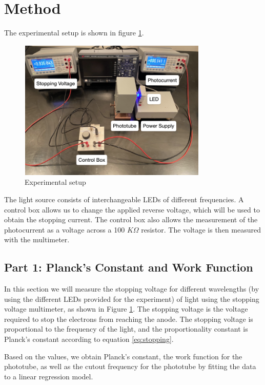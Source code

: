 \section{Method}

The experimental setup is shown in figure \ref{fig:setup}.

\begin{figure}[H]
    \centering
    \includegraphics[width=0.8\textwidth]{method/setup.png}
    \caption{Experimental setup}
    \label{fig:setup}
\end{figure}

The light source consists of interchangeable LEDs of different frequencies. A control box allows us to change the applied reverse voltage, which will be used to obtain the stopping current.
The control box also allows the measurement of the photocurrent as a voltage across a 100 $K\Omega$ resistor. The voltage is then measured with the multimeter.

\subsection{Part 1: Planck's Constant and Work Function}

In this section we will measure the stopping voltage for different wavelengths (by using the different LEDs provided for the experiment) of light using the stopping voltage multimeter, as shown in Figure \ref{fig:setup}.
The stopping voltage is the voltage required to stop the electrons from reaching the anode.
The stopping voltage is proportional to the frequency of the light, and the proportionality constant is Planck's constant according to equation \ref{eq:stopping}.

Based on the values, we obtain Planck's constant, the work function for the phototube, as well as the cutout frequency for the phototube by fitting the data to a linear regression model.

